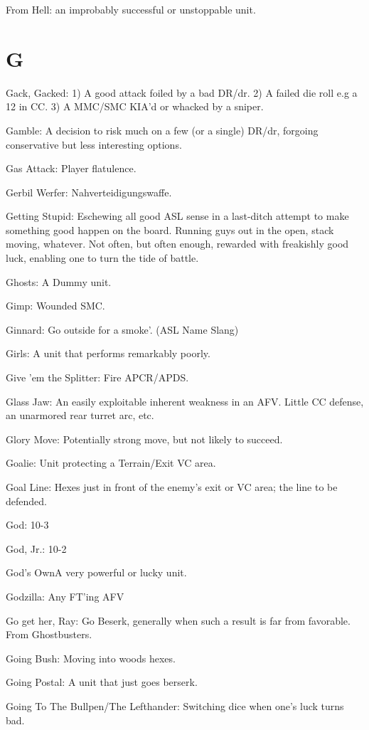 \documentclass[letterpaper]{article}
\begin{document}
From Hell: an improbably successful or unstoppable unit.

\section{G}

Gack, Gacked: 1) A good attack foiled by a bad DR/dr. 2) A failed die roll e.g a 12 in CC. 3) A MMC/SMC KIA'd or whacked by a sniper.

Gamble: A decision to risk much on a few (or a single) DR/dr, forgoing conservative but less interesting options.

Gas Attack: Player flatulence.

Gerbil Werfer: Nahverteidigungswaffe.

Getting Stupid: Eschewing all good ASL sense in a last-ditch attempt to
make something good happen on the board. Running guys out in the open,
stack moving, whatever. Not often, but often enough, rewarded with
freakishly good luck, enabling one to turn the tide of battle.

Ghosts: A Dummy unit.

Gimp:  Wounded SMC.

Ginnard: Go outside for a smoke'. (ASL Name Slang)

Girls: A unit that performs remarkably poorly.

Give 'em the Splitter: Fire APCR/APDS.

Glass Jaw: An easily exploitable inherent weakness in an AFV. Little CC defense, an unarmored rear turret arc, etc.

Glory Move: Potentially strong move, but not likely to succeed.

Goalie: Unit protecting a Terrain/Exit VC area.

Goal Line: Hexes just in front of the enemy's exit or VC area; the line to be defended.

God: 10-3

God, Jr.: 10-2

God's OwnA very powerful or lucky unit.

Godzilla: Any FT'ing AFV

Go get her, Ray: Go Beserk, generally when such a result is far from favorable. From Ghostbusters.

Going Bush: Moving into woods hexes.

Going Postal:  A unit that just goes berserk.

Going To The Bullpen/The Lefthander: Switching dice when one's luck turns bad.
\end{document}
